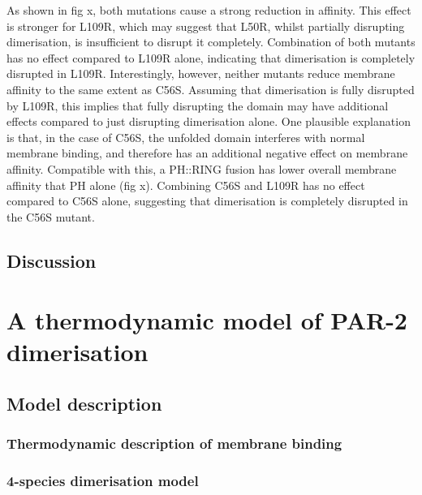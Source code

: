 \documentclass[12pt]{"article"}
\begin{document}
As shown in fig x, both mutations cause a strong reduction in affinity. This effect is stronger for L109R, which may suggest that L50R, whilst partially disrupting dimerisation, is insufficient to disrupt it completely. Combination of both mutants has no effect compared to L109R alone, indicating that dimerisation is completely disrupted in L109R. Interestingly, however, neither mutants reduce membrane affinity to the same extent as C56S. Assuming that dimerisation is fully disrupted by L109R, this implies that fully disrupting the domain may have additional effects compared to just disrupting dimerisation alone. One plausible explanation is that, in the case of C56S, the unfolded domain interferes with normal membrane binding, and therefore has an additional negative effect on membrane affinity. Compatible with this, a PH::RING fusion has lower overall membrane affinity that PH alone (fig x). Combining C56S and L109R has no effect compared to C56S alone, suggesting that dimerisation is completely disrupted in the C56S mutant.\\

\clearpage
\subsection{Discussion}


\clearpage
\section{A thermodynamic model of PAR-2 dimerisation}


\subsection{Model description}

\subsubsection{Thermodynamic description of membrane binding}

\subsubsection{4-species dimerisation model}

\end{document}
